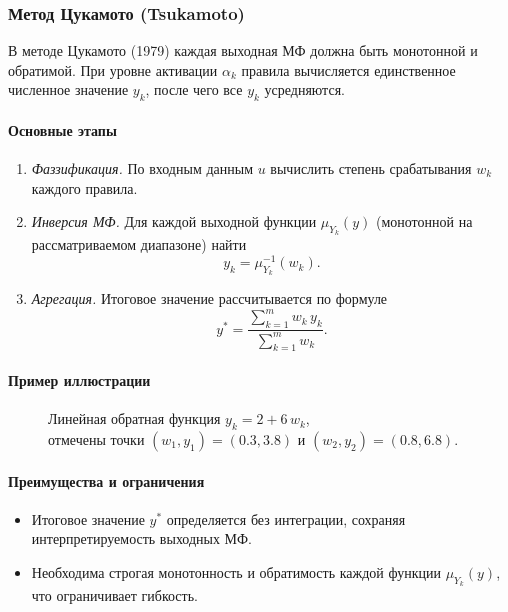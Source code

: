 \subsubsection{Метод Цукамото (Tsukamoto)}
\label{subsubsec:tsukamoto}

В методе Цукамото (1979) каждая выходная МФ должна быть монотонной и обратимой. При уровне активации $\alpha_k$ правила вычисляется единственное численное значение $y_k$, после чего все $y_k$ усредняются.

\paragraph{Основные этапы}
\begin{enumerate}
  \item \emph{Фаззификация.} По входным данным $u$ вычислить степень срабатывания $w_k$ каждого правила.
  \item \emph{Инверсия МФ.} Для каждой выходной функции $\mu_{Y_k}(y)$ (монотонной на рассматриваемом диапазоне) найти
    \[
      y_k = \mu_{Y_k}^{-1}(w_k).
    \]
  \item \emph{Агрегация.} Итоговое значение рассчитывается по формуле
    \[
      y^* = \frac{\sum_{k=1}^m w_k\,y_k}{\sum_{k=1}^m w_k}.
    \]
\end{enumerate}

\paragraph{Пример иллюстрации}
\begin{figure}[H]
  \centering
  \caption{%
    Линейная обратная функция $y_k=2+6\,w_k$, \\
    отмечены точки $(w_1,y_1)=(0.3,3.8)$ и $(w_2,y_2)=(0.8,6.8)$.}
\end{figure}

\paragraph{Преимущества и ограничения}
\begin{itemize}
  \item Итоговое значение $y^*$ определяется без интеграции, сохраняя интерпретируемость выходных МФ.
  \item Необходима строгая монотонность и обратимость каждой функции $\mu_{Y_k}(y)$, что ограничивает гибкость.
\end{itemize}

